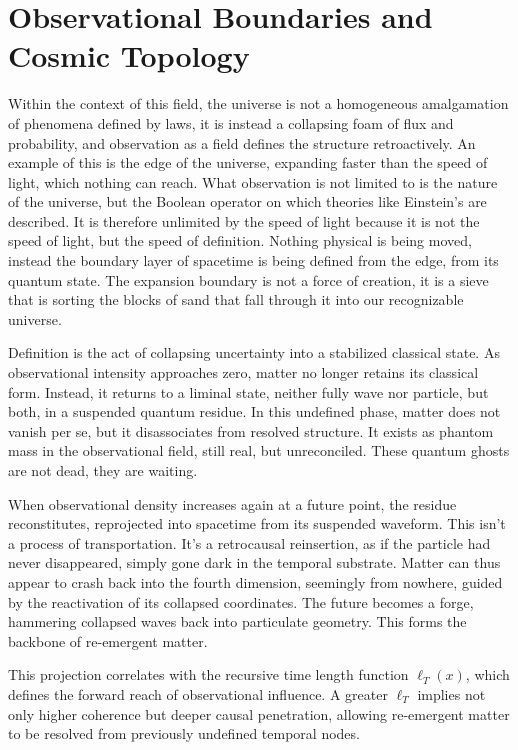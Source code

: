 \setcounter{chapter}{6}  %
\setcounter{page}{120}
\chapter{Observational Boundaries and Cosmic Topology}

Within the context of this field, the universe is not a homogeneous amalgamation of phenomena defined by laws, it is instead a collapsing foam of flux and probability, and observation as a field defines the structure retroactively. An example of this is the edge of the universe, expanding faster than the speed of light, which nothing can reach. What observation is not limited to is the nature of the universe, but the Boolean operator on which theories like Einstein’s are described. It is therefore unlimited by the speed of light because it is not the speed of light, but the speed of definition. Nothing physical is being moved, instead the boundary layer of spacetime is being defined from the edge, from its quantum state. The expansion boundary is not a force of creation, it is a sieve that is sorting the blocks of sand that fall through it into our recognizable universe.

Definition is the act of collapsing uncertainty into a stabilized classical state. As observational intensity approaches zero, matter no longer retains its classical form. Instead, it returns to a liminal state, neither fully wave nor particle, but both, in a suspended quantum residue. In this undefined phase, matter does not vanish per se, but it disassociates from resolved structure. It exists as phantom mass in the observational field, still real, but unreconciled. These quantum ghosts are not dead, they are waiting.

When observational density increases again at a future point, the residue reconstitutes, reprojected into spacetime from its suspended waveform. This isn't a process of transportation. It's a retrocausal reinsertion, as if the particle had never disappeared, simply gone dark in the temporal substrate. Matter can thus appear to crash back into the fourth dimension, seemingly from nowhere, guided by the reactivation of its collapsed coordinates. The future becomes a forge, hammering collapsed waves back into particulate geometry. This forms the backbone of re-emergent matter.

This projection correlates with the recursive time length function $\ell_T(x)$, which defines the forward reach of observational influence. A greater $\ell_T$ implies not only higher coherence but deeper causal penetration, allowing re-emergent matter to be resolved from previously undefined temporal nodes.

